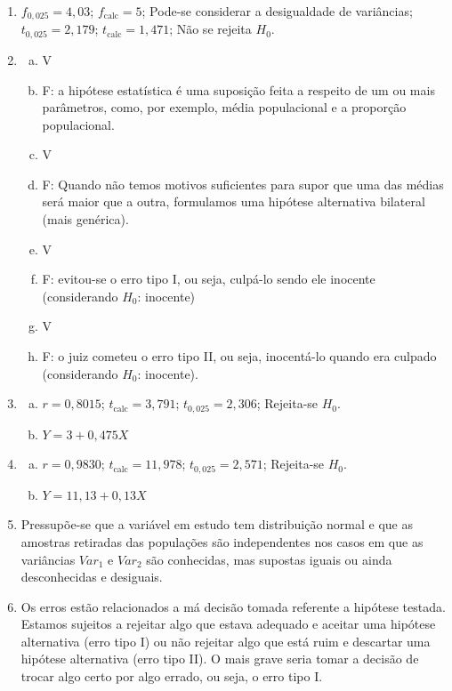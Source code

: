 \documentclass[12pt, a4paper]{article}
\begin{document}
\begin{enumerate}
    \item $f_{0,025}=4,03$; $f_{\text{calc}}=5$; Pode-se considerar a desigualdade de variâncias; $t_{0,025}=2,179$; $t_{\text{calc}}=1,471$; Não se rejeita $H_0$.
    \item 
    \begin{enumerate}[a)]
        \item V
        \item F: a hipótese estatística é uma suposição feita a respeito de um ou mais parâmetros, como, por exemplo, média populacional e a proporção populacional.
        \item V
        \item F: Quando não temos motivos suficientes para supor que uma das médias será maior que a outra, formulamos uma hipótese alternativa bilateral (mais genérica).
        \item V
        \item F: evitou-se o erro tipo I, ou seja, culpá-lo sendo ele inocente (considerando $H_0$: inocente)
        \item V
        \item F: o juiz cometeu o erro tipo II, ou seja, inocentá-lo quando era culpado (considerando $H_0$: inocente).
    \end{enumerate}
    \item 
    \begin{enumerate}[a)]
        \item $r=0,8015$; $t_{\text{calc}}=3,791$; $t_{0,025}=2,306$; Rejeita-se $H_0$.
        \item $Y=3+0,475 X$
    \end{enumerate}
    \item 
    \begin{enumerate}[a)]
        \item $r=0,9830$; $t_{\text{calc}}=11,978$; $t_{0,025}=2,571$; Rejeita-se $H_0$.
        \item $Y=11,13+0,13 X$
    \end{enumerate}
    \item Pressupõe-se que a variável em estudo tem distribuição normal e que as amostras retiradas das populações são independentes nos casos em que as variâncias $Var_1$ e $Var_2$ são conhecidas, mas supostas iguais ou ainda desconhecidas e desiguais.
    \item Os erros estão relacionados a má decisão tomada referente a hipótese testada. Estamos sujeitos a rejeitar algo que estava adequado e aceitar uma hipótese alternativa (erro tipo I) ou não rejeitar algo que está ruim e descartar uma hipótese alternativa (erro tipo II). O mais grave seria tomar a decisão de trocar algo certo por algo errado, ou seja, o erro tipo I.

\end{enumerate}
\end{document}
